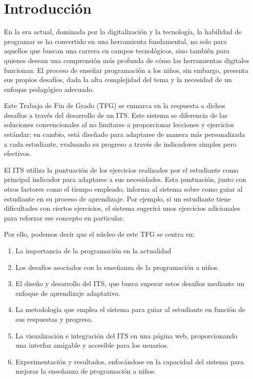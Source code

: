\chapter{Introducción} \label{chap:introduction}

En la era actual, dominada por la digitalización y la tecnología, la habilidad de programar se ha convertido en una herramienta fundamental, no solo para aquellos que buscan una carrera en campos tecnológicos, sino también para quienes desean una comprensión más profunda de cómo las herramientas digitales funcionan. El proceso de enseñar programación a los niños, sin embargo, presenta sus propios desafíos, dada la alta complejidad del tema y la necesidad de un enfoque pedagógico adecuado.

Este Trabajo de Fin de Grado (TFG) se enmarca en la respuesta a dichos desafíos a través del desarrollo de un ITS. Este sistema se diferencia de las soluciones convencionales al no limitarse a proporcionar lecciones y ejercicios estándar; en cambio, está diseñado para adaptarse de manera más personalizada a cada estudiante, evaluando su progreso a través de indicadores simples pero efectivos.

El ITS utiliza la puntuación de los ejercicios realizados por el estudiante como principal indicador para adaptarse a sus necesidades. Esta puntuación, junto con otros factores como el tiempo empleado, informa al sistema sobre como guiar al estudiante en su proceso de aprendizaje. Por ejemplo, si un estudiante tiene dificultades con ciertos ejercicios, el sistema sugerirá unos ejercicios adicionales para reforzar ese concepto en particular.

Por ello, podemos decir que el núcleo de este TFG se centra en:

\begin{enumerate}
    \item La importancia de la programación en la actualidad
    \item Los desafíos asociados con la enseñanza de la programación a niños.
    \item El diseño y desarrollo del ITS, que busca superar estos desafíos mediante un enfoque de aprendizaje adaptativo.
    \item La metodología que emplea el sistema para guiar al estudiante en función de sus respuestas y progreso.
    \item La visualización e integración del ITS en una página web, proporcionando una interfaz amigable y accesible para los usuarios.
    \item Experimentación y resultados, enfocándose en la capacidad del sistema para mejorar la enseñanza de programación a niños.
\end{enumerate}

